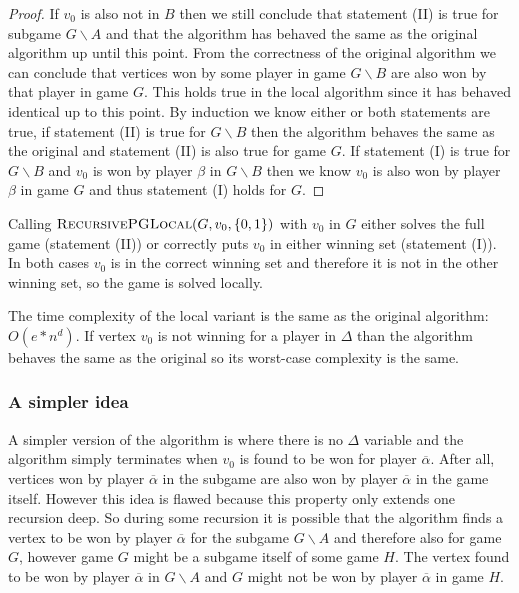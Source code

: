 \begin{theorem}
\begin{proof}
	If $v_0$ is also not in $B$ then we still conclude that statement (II) is true for subgame $G\backslash A$ and that the algorithm has behaved the same as the original algorithm up until this point. From the correctness of the original algorithm we can conclude that vertices won by some player in game $G\backslash B$ are also won by that player in game $G$. This holds true in the local algorithm since it has behaved identical up to this point. By induction we know either or both statements are true, if statement (II) is true for $G\backslash B$ then the algorithm behaves the same as the original and statement (II) is also true for game $G$. If statement (I) is true for $G \backslash B$ and $v_0$ is won by player $\beta$ in $G\backslash B$ then we know $v_0$ is also won by player $\beta$ in game $G$ and thus statement (I) holds for $G$.
\end{proof}
\end{theorem}
Calling $\textsc{RecursivePGLocal}(G, v_0, \{0,1\})$ with $v_0$ in $G$ either solves the full game (statement (II)) or correctly puts $v_0$ in either winning set (statement (I)). In both cases $v_0$ is in the correct winning set and therefore it is not in the other winning set, so the game is solved locally.

The time complexity of the local variant is the same as the original algorithm: $O(e*n^d)$. If vertex $v_0$ is not winning for a player in $\Delta$ than the algorithm behaves the same as the original so its worst-case complexity is the same.

\subsubsection{A simpler idea} A simpler version of the algorithm is where there is no $\Delta$ variable and the algorithm simply terminates when $v_0$ is found to be won for player $\overline{\alpha}$. After all, vertices won by player $\overline{\alpha}$ in the subgame are also won by player $\overline{\alpha}$ in the game itself. However this idea is flawed because this property only extends one recursion deep. So during some recursion it is possible that the algorithm finds a vertex to be won by player $\overline{\alpha}$ for the subgame $G\backslash A$ and therefore also for game $G$, however game $G$ might be a subgame itself of some game $H$. The vertex found to be won by player $\overline{\alpha}$ in $G\backslash A$ and $G$ might not be won by player $\overline{\alpha}$ in game $H$.

